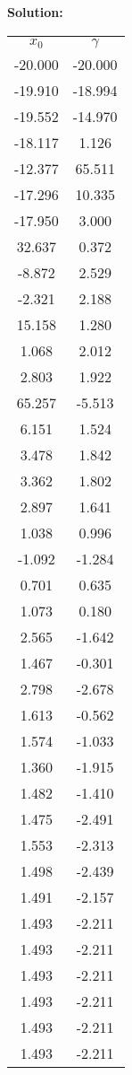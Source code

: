 \documentclass[11pt]{article}
\begin{document}
{\noindent \bf Solution:
\ \\

\begin{table}
    \centering
    \begin{tabular}{c|c}
         $x_0$&$\gamma$\\
       
-20.000 & -20.000 \\
-19.910 & -18.994 \\
-19.552 & -14.970 \\
-18.117 & 1.126 \\
-12.377 & 65.511 \\
-17.296 & 10.335 \\
-17.950 & 3.000 \\
32.637 & 0.372 \\
-8.872 & 2.529 \\
-2.321 & 2.188 \\
15.158 & 1.280 \\
1.068 & 2.012 \\
2.803 & 1.922 \\
65.257 & -5.513 \\
6.151 & 1.524 \\
3.478 & 1.842 \\
3.362 & 1.802 \\
2.897 & 1.641 \\
1.038 & 0.996 \\
-1.092 & -1.284 \\
0.701 & 0.635 \\
1.073 & 0.180 \\
2.565 & -1.642 \\
1.467 & -0.301 \\
2.798 & -2.678 \\
1.613 & -0.562 \\
1.574 & -1.033 \\
1.360 & -1.915 \\
1.482 & -1.410 \\
1.475 & -2.491 \\
1.553 & -2.313 \\
1.498 & -2.439 \\
1.491 & -2.157 \\
1.493 & -2.211 \\
1.493 & -2.211 \\
1.493 & -2.211 \\
1.493 & -2.211 \\
1.493 & -2.211 \\
1.493 & -2.211


\end{tabular}
\end{table}}
\end{document}
